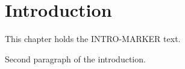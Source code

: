 \section{Introduction}

This chapter holds the INTRO-MARKER text.

Second paragraph of the introduction.
